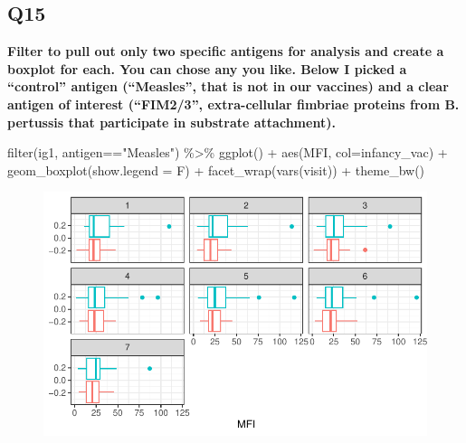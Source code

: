 \documentclass[
  letterpaper,
  DIV=11,
  numbers=noendperiod]{scrartcl}
\newenvironment{Shaded}{\begin{snugshade}}{\end{snugshade}}
\newcommand{\AttributeTok}[1]{\textcolor[rgb]{0.40,0.45,0.13}{#1}}
\newcommand{\FunctionTok}[1]{\textcolor[rgb]{0.28,0.35,0.67}{#1}}
\newcommand{\NormalTok}[1]{\textcolor[rgb]{0.00,0.23,0.31}{#1}}
\newcommand{\SpecialCharTok}[1]{\textcolor[rgb]{0.37,0.37,0.37}{#1}}
\newcommand{\StringTok}[1]{\textcolor[rgb]{0.13,0.47,0.30}{#1}}
\begin{document}
\hypertarget{q15}{%
\subsection{Q15}\label{q15}}

\textbf{Filter to pull out only two specific antigens for analysis and
create a boxplot for each. You can chose any you like. Below I picked a
``control'' antigen (``Measles'', that is not in our vaccines) and a
clear antigen of interest (``FIM2/3'', extra-cellular fimbriae proteins
from B. pertussis that participate in substrate attachment).}

\begin{Shaded}
\begin{Highlighting}[]
\FunctionTok{filter}\NormalTok{(ig1, antigen}\SpecialCharTok{==}\StringTok{"Measles"}\NormalTok{) }\SpecialCharTok{\%\textgreater{}\%}
  \FunctionTok{ggplot}\NormalTok{() }\SpecialCharTok{+}
  \FunctionTok{aes}\NormalTok{(MFI, }\AttributeTok{col=}\NormalTok{infancy\_vac) }\SpecialCharTok{+}
  \FunctionTok{geom\_boxplot}\NormalTok{(}\AttributeTok{show.legend =}\NormalTok{ F) }\SpecialCharTok{+}
  \FunctionTok{facet\_wrap}\NormalTok{(}\FunctionTok{vars}\NormalTok{(visit)) }\SpecialCharTok{+}
  \FunctionTok{theme\_bw}\NormalTok{()}
\end{Highlighting}
\end{Shaded}

\begin{figure}[H]

{\centering \includegraphics{Class19_files/figure-pdf/unnamed-chunk-26-1.pdf}

}

\end{figure}
\end{document}
